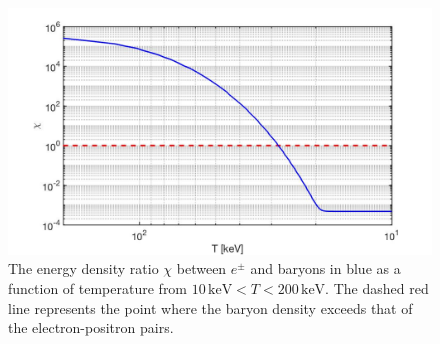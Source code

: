 \documentclass[universe,article,submit,moreauthors,pdftex,a4paper]{Definitions/mdpi}
\begin{document}
\begin{figure}[h]
\centering
\includegraphics[width=\linewidth]{EnergyDensityRatio002.jpg}
\caption{The energy density ratio $\chi$ between $e^{\pm}$ and baryons in blue as a function of temperature from $10\,\mathrm{keV}< T<200\,\mathrm{keV}$. The dashed red line represents the point where the baryon density exceeds that of the electron-positron pairs.}
\label{ratio_fig} 
\end{figure}
\end{document}
